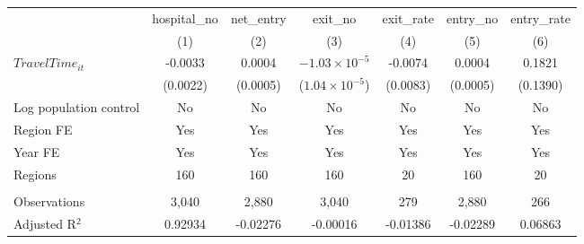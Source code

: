 \begingroup
\centering
\begin{tabular}{lcccccc}
   \toprule
                          & hospital\_no  & net\_entry  & exit\_no                & exit\_rate  & entry\_no  & entry\_rate \\    
                          & (1)           & (2)         & (3)                     & (4)         & (5)        & (6)\\  
   \midrule 
   $TravelTime_{it}$      & -0.0033       & 0.0004      & $-1.03\times 10^{-5}$   & -0.0074     & 0.0004     & 0.1821\\   
                          & (0.0022)      & (0.0005)    & ($1.04\times 10^{-5}$)  & (0.0083)    & (0.0005)   & (0.1390)\\   
   Log population control & No            & No          & No                      & No          & No         & No\\  
   Region FE              & Yes           & Yes         & Yes                     & Yes         & Yes        & Yes\\  
   Year FE                & Yes           & Yes         & Yes                     & Yes         & Yes        & Yes\\  
   Regions                & 160           & 160         & 160                     & 20          & 160        & 20\\  
    \\
   Observations           & 3,040         & 2,880       & 3,040                   & 279         & 2,880      & 266\\  
   Adjusted R$^2$         & 0.92934       & -0.02276    & -0.00016                & -0.01386    & -0.02289   & 0.06863\\  
   \bottomrule
\end{tabular}
\par\endgroup
